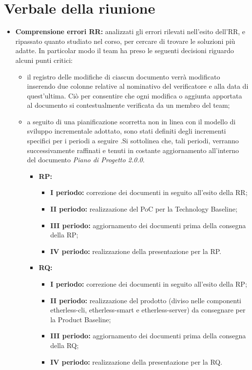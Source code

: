\section{Verbale della riunione}
	\begin{itemize}
		\item \textbf{Comprensione errori RR:} analizzati gli errori rilevati nell'esito dell'RR, e ripassato quanto studiato nel corso, per cercare di trovare le soluzioni più adatte. In particolar modo il team ha preso le seguenti decisioni riguardo alcuni punti critici:
		\begin{itemize}
			\item il registro delle modifiche di ciascun documento verrà modificato inserendo due colonne relative al nominativo del verificatore e alla data di quest'ultima. Ciò per consentire che ogni modifica o aggiunta apportata al documento si contestualmente verificata da un membro del team;
			\item a seguito di una pianificazione scorretta non in linea con il modello di sviluppo incrementale adottato, sono stati definiti degli incrementi specifici per i periodi a seguire .Si sottolinea che, tali periodi, verranno successivamente raffinati e tenuti in costante aggiornamento all'interno del documento \textit{Piano di Progetto 2.0.0}.
			\begin{itemize}
				\item \textbf{RP:}
				\begin{itemize}
					\item \textbf{I periodo:} correzione dei documenti in seguito all'esito della RR;
					\item \textbf{II periodo:} realizzazione del PoC per la Technology Baseline;
					\item \textbf{III periodo:} aggiornamento dei documenti prima della consegna della RP;
					\item \textbf{IV periodo:} realizzazione della presentazione per la RP.
				\end{itemize}
				\item \textbf{RQ:}
				\begin{itemize}
					\item \textbf{I periodo:} correzione dei documenti in seguito all'esito della RP;
					\item \textbf{II periodo:} realizzazione del prodotto (diviso nelle componenti etherless-cli, etherless-smart e etherless-server) da consegnare per la Product Baseline;
					\item \textbf{III periodo:} aggiornamento dei documenti prima della consegna della RQ;
					\item \textbf{IV periodo:} realizzazione della presentazione per la RQ.
				\end{itemize}
			\end{itemize} 
			

\end{itemize}
\end{itemize}
